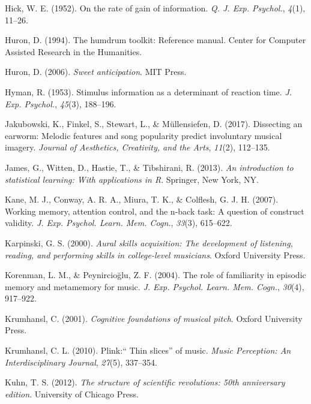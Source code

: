 \documentclass[english,man]{apa6}
\begin{document}
\leavevmode\hypertarget{ref-Hick1952-mj}{}%
Hick, W. E. (1952). On the rate of gain of information. \emph{Q. J. Exp. Psychol.}, \emph{4}(1), 11--26.

\leavevmode\hypertarget{ref-Huron1994-gt}{}%
Huron, D. (1994). The humdrum toolkit: Reference manual. Center for Computer Assisted Research in the Humanities.

\leavevmode\hypertarget{ref-Huron2006-ly}{}%
Huron, D. (2006). \emph{Sweet anticipation}. MIT Press.

\leavevmode\hypertarget{ref-Hyman1953-xw}{}%
Hyman, R. (1953). Stimulus information as a determinant of reaction time. \emph{J. Exp. Psychol.}, \emph{45}(3), 188--196.

\leavevmode\hypertarget{ref-Jakubowski2017-pz}{}%
Jakubowski, K., Finkel, S., Stewart, L., \& Müllensiefen, D. (2017). Dissecting an earworm: Melodic features and song popularity predict involuntary musical imagery. \emph{Journal of Aesthetics, Creativity, and the Arts}, \emph{11}(2), 112--135.

\leavevmode\hypertarget{ref-James2013-zf}{}%
James, G., Witten, D., Hastie, T., \& Tibshirani, R. (2013). \emph{An introduction to statistical learning: With applications in R}. Springer, New York, NY.

\leavevmode\hypertarget{ref-Kane2007-pt}{}%
Kane, M. J., Conway, A. R. A., Miura, T. K., \& Colflesh, G. J. H. (2007). Working memory, attention control, and the n-back task: A question of construct validity. \emph{J. Exp. Psychol. Learn. Mem. Cogn.}, \emph{33}(3), 615--622.

\leavevmode\hypertarget{ref-Karpinski2000-qz}{}%
Karpinski, G. S. (2000). \emph{Aural skills acquisition: The development of listening, reading, and performing skills in college-level musicians}. Oxford University Press.

\leavevmode\hypertarget{ref-Korenman2004-zu}{}%
Korenman, L. M., \& Peynircioğlu, Z. F. (2004). The role of familiarity in episodic memory and metamemory for music. \emph{J. Exp. Psychol. Learn. Mem. Cogn.}, \emph{30}(4), 917--922.

\leavevmode\hypertarget{ref-Krumhansl2001-nq}{}%
Krumhansl, C. (2001). \emph{Cognitive foundations of musical pitch}. Oxford University Press.

\leavevmode\hypertarget{ref-Krumhansl2010-ws}{}%
Krumhansl, C. L. (2010). Plink:`` Thin slices'' of music. \emph{Music Perception: An Interdisciplinary Journal}, \emph{27}(5), 337--354.

\leavevmode\hypertarget{ref-Kuhn2012-bx}{}%
Kuhn, T. S. (2012). \emph{The structure of scientific revolutions: 50th anniversary edition}. University of Chicago Press.
\end{document}
